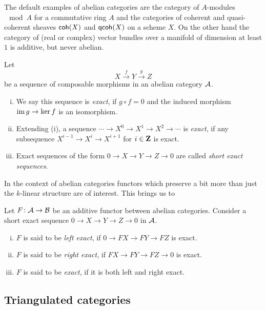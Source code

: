 \begin{example}
    The default examples of abelian categories are the category of $A$-modules $\mod{A}$ for a commutative ring $A$ and the categories of coherent and quasi-coherent sheaves $\textsf{coh}(X)$ and $\textsf{qcoh}(X)$ on a scheme $X$. On the other hand the category of (real or complex) vector bundles over a manifold of dimension at least $1$ is additive, but never abelian.
\end{example}

\begin{definition}
    Let
    \[
        X \xrightarrow{\ f \ } Y \xrightarrow{\ g\ } Z
    \]
    be a sequence of composable morphisms in an abelian category $\mathcal A$.  
    \begin{enumerate}[(i)]    
        \item We say this sequence is \emph{exact}, if $g \circ f = 0$ and the induced morphism $\operatorname{im} g \to \ker f$ is an isomorphism.

        \item Extending (i), a sequence $\cdots \to X^0 \to X^1 \to X^2 \to \cdots$ is \emph{exact}, if any subsequence $X^{i-1} \to X^i \to X^{i+1}$ for $i \in \mathbf Z$ is exact. 
        \item Exact sequences of the form $0 \to X \to Y \to Z \to 0$ are called \emph{short exact sequences}.
    \end{enumerate}
\end{definition}

In the context of abelian categories functors which preserve a bit more than just the $k$-linear structure are of interest. This brings us to

\begin{definition}
    Let $F \colon \mathcal A \to \mathcal B$ be an additive functor between abelian categories. Consider a short exact sequence $0 \to X \to Y \to Z \to 0$ in $\mathcal A$.
    \begin{enumerate}[(i)]
        \item $F$ is said to be \emph{left exact}, if $0 \to FX \to FY \to FZ$ is exact.
        \item $F$ is said to be \emph{right exact}, if $FX \to FY \to FZ \to 0$ is exact.
        \item $F$ is said to be \emph{exact}, if it is both left and right exact. 
    \end{enumerate}
\end{definition}

\subsection{Triangulated categories}

